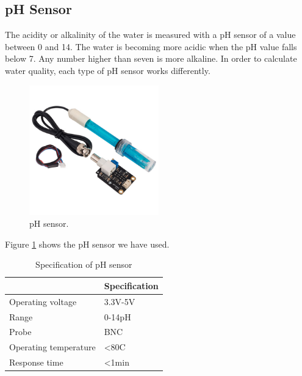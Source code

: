 \subsection{pH Sensor}
The acidity or alkalinity of the water is measured with a pH sensor of a value between 0 and 14. The water is becoming more acidic when the pH value falls below 7. Any number higher than seven is more alkaline. In order to calculate water quality, each type of pH sensor works differently.
\begin{figure}[h]
\centering
\includegraphics[width=0.5\textwidth]{figures/ph_sensor.jpg}
\caption{pH sensor.}
\label{pH1}
\end{figure}
Figure \ref{pH1} shows the pH sensor we have used.

\begin{table}[H]
\centering
\caption{Specification of pH sensor}
\begin{tabular}{|l|l|}
\hline
\multicolumn{1}{|c|}{\cellcolor[HTML]{FFFFFF}{\color[HTML]{333333} \textbf{Characteristics}}} & \textbf{Specification} \\ \hline
Operating voltage                                                                       & 3.3V-5V                \\ \hline
Range                                                                                   & 0-14pH                 \\ \hline
Probe                                                                                   & BNC                    \\ \hline
Operating temperature                                                                   & \textless{}80C         \\ \hline
Response time                                                                           & \textless{}1min        \\ \hline
\end{tabular}
\end{table}

